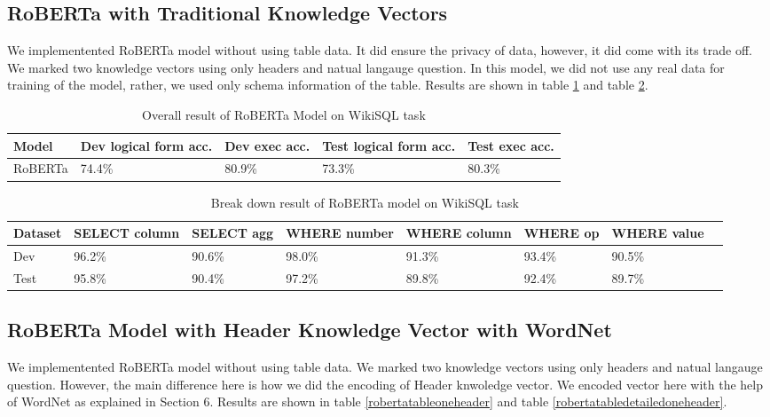 \documentclass[12pt]{article}
\begin{document}
\subsection{RoBERTa with Traditional Knowledge Vectors}

We implementented RoBERTa model without using table data. It did ensure the privacy of data, however, it did come with its trade off. We marked two knowledge vectors using only headers and natual langauge question. In this model, we did not use any real data for training of the model, rather, we used only schema information of the table. Results are shown in table \ref{robertatable} and table \ref{robertatabledetailed}.

 \begin{table}
\centering
 \begin{tabular}{| m{2cm} | m{2cm}| m{2cm} |m{2cm}| m{2cm} |} 
 \hline
Model & Dev logical form acc. & Dev exec acc. & Test logical form acc. & Test exec acc. \\ 
 \hline\hline
  RoBERTa & 74.4\% & 80.9\% & 73.3\% & 80.3\% \\ 
 \hline
\end{tabular}
\caption{Overall result of RoBERTa Model on WikiSQL task}
\label{robertatable}
\end{table}


\begin{table}
\centering
 \begin{tabular}{| m{2cm} | m{2cm}| m{2cm} |m{2cm}| m{2cm} |m{2cm} | m{2cm} |m{2cm} |} 
 \hline
  Dataset & SELECT column & SELECT agg & WHERE number & WHERE column & WHERE op & WHERE value\\ 
 \hline\hline
  Dev & 96.2\% & 90.6\% & 98.0\% & 91.3\% & 93.4\% &  90.5\% \\ 
\hline
 Test & 95.8\% & 90.4\% & 97.2\% & 89.8\% & 92.4\% &  89.7\% \\ 
 \hline

\end{tabular}
\caption{Break down result of RoBERTa model on WikiSQL task}
\label{robertatabledetailed}
\end{table}

\subsection{RoBERTa Model with Header Knowledge Vector with WordNet}

We implementented RoBERTa model without using table data. We marked two knowledge vectors using only headers and natual langauge question. However, the main difference here is how we did the  encoding of Header knwoledge vector. We encoded vector here with the help of WordNet as explained in Section 6. Results are shown in table \ref{robertatableoneheader} and table \ref{robertatabledetailedoneheader}.
\end{document}
